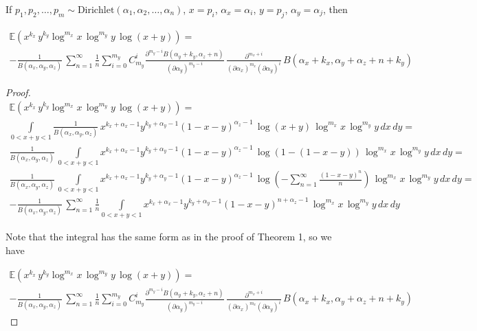 \documentclass{article}
\begin{document}
\begin{theorem}
	If $p_1, p_2, \ldots, p_m \sim \textrm{Dirichlet}(\alpha_1, \alpha_2, \ldots, \alpha_n)$, $x = p_i$, $\alpha_x = \alpha_i$, $y = p_j$, $\alpha_y = \alpha_j$, then
	
	\begin{multline*}
	\mathbb{E}(x^{k_x}\, y^{k_y} \log^{m_x}{x} \, \log^{m_y}{y} \, \log(x + y)) = 
	\\ -\frac{1}{B(\alpha_x, \alpha_y, \alpha_z)} \, \sum_{n=1}^{\infty}{\frac{1}{n} \sum_{i=0}^{m_y}{ C^i_{m_y} \frac{\partial^{m_y-i} B(\alpha_y + k_y, \alpha_z + n)}{(\partial \alpha_y)^{m_y-i}} \, \frac{\partial^{m_x + i}}{(\partial \alpha_x)^{m_x} (\partial \alpha_y)^{i}} \, B(\alpha_x + k_x, \alpha_y + \alpha_z + n + k_y)}} 
	\end{multline*}	
	
	\begin{proof}
		
		\begin{multline}
		\mathbb{E}(x^{k_x}\, y^{k_y} \log^{m_x}{x} \, \log^{m_y}{y} \, \log(x + y)) = 
		\\ \int\limits_{0 < x + y < 1}{\frac{1}{B(\alpha_x, \alpha_y, \alpha_z)} \, x^{k_x + \alpha_x - 1} y^{k_y + \alpha_y - 1} (1 - x - y)^{\alpha_z - 1} \, \log(x + y) \, \log^{m_x}{x} \, \log^{m_y}{y} \, dx \, dy} = 
		\\ \frac{1}{B(\alpha_x, \alpha_y, \alpha_z)} \, \int\limits_{0 < x + y < 1}{x^{k_x + \alpha_x - 1} y^{k_y + \alpha_y - 1} (1 - x - y)^{\alpha_z - 1} \, \log(1 - (1 - x - y)) \, \log^{m_x}{x} \, \log^{m_y}{y} \, dx \, dy} = 
		\\ \frac{1}{B(\alpha_x, \alpha_y, \alpha_z)} \, \int\limits_{0 < x + y < 1}{x^{k_x + \alpha_x - 1} y^{k_y + \alpha_y - 1} (1 - x - y)^{\alpha_z - 1} \, \log(-\sum_{n=1}^{\infty}{\frac{(1 - x - y)^n}{n}}) \, \log^{m_x}{x} \, \log^{m_y}{y} \, dx \, dy} = 
		\\-\frac{1}{B(\alpha_x, \alpha_y, \alpha_z)} \, \sum_{n=1}^{\infty}{\frac{1}{n} \int\limits_{0 < x + y < 1}{x^{k_x + \alpha_x - 1} y^{k_y + \alpha_y - 1} (1 - x - y)^{n + \alpha_z - 1} \, \log^{m_x}{x} \, \log^{m_y}{y} \, dx \, dy}}
		\end{multline}
		
		Note that the integral has the same form as in the proof of Theorem 1, so we have
		
		\begin{multline*}
		\mathbb{E}(x^{k_x}\, y^{k_y} \log^{m_x}{x} \, \log^{m_y}{y} \, \log(x + y)) = 
		\\ -\frac{1}{B(\alpha_x, \alpha_y, \alpha_z)} \, \sum_{n=1}^{\infty}{\frac{1}{n} \sum_{i=0}^{m_y}{ C^i_{m_y} \frac{\partial^{m_y-i} B(\alpha_y + k_y, \alpha_z + n)}{(\partial \alpha_y)^{m_y-i}} \, \frac{\partial^{m_x + i}}{(\partial \alpha_x)^{m_x} (\partial \alpha_y)^{i}} \, B(\alpha_x + k_x, \alpha_y + \alpha_z + n + k_y)}} 
		\end{multline*}	
		
	\end{proof}
\end{theorem}
\end{document}
